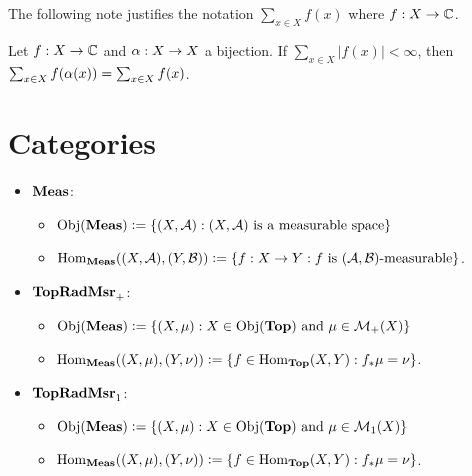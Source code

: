 \documentclass{book}
\begin{document}
	The following note justifies the notation $\sum_{x \in X}f(x)$ where $f:X \rightarrow \C$.
	
	\begin{note}
		Let $f:X \rightarrow \C$ and $\al:X \rightarrow X$ a bijection. If $\sum_{x \in X}|f(x)|< \infty$, then $\sum_{x \in X}f( \al (x)) = \sum_{x \in X}f(x) $.
	\end{note}















	\chapter{Categories}
	
	\begin{defn}
		\begin{itemize}\
			\item $\Meas$:
			\begin{itemize}
				\item $\Obj(\Meas) \defeq \{(X, \MA): (X, \MA) \text{ is a measurable space} \}$
				\item $\Hom_{\Meas}((X, \MA), (Y, \MB)) \defeq \{f:X \rightarrow Y: f \text{ is $(\MA, \MB)$-measurable}\}$.
			\end{itemize}
			\item $\TopRadMsrpos$: 
			\begin{itemize}
				\item $\Obj(\Meas) \defeq \{(X, \mu): X \in \Obj(\Top) \text{ and } \mu \in \MM_+(X) \}$
				\item $\Hom_{\Meas}((X, \mu), (Y, \nu)) \defeq \{f \in \Hom_{\Top}(X, Y): f_*\mu = \nu\}$.
			\end{itemize}
			\item $\TopRadMsrone$: 
			\begin{itemize}
				\item $\Obj(\Meas) \defeq \{(X, \mu): X \in \Obj(\Top) \text{ and } \mu \in \MM_1(X) \}$
				\item $\Hom_{\Meas}((X, \mu), (Y, \nu)) \defeq \{f \in \Hom_{\Top}(X, Y): f_*\mu = \nu\}$.
			\end{itemize}
		\end{itemize}
	\end{defn}
	
	
	
\end{document}
